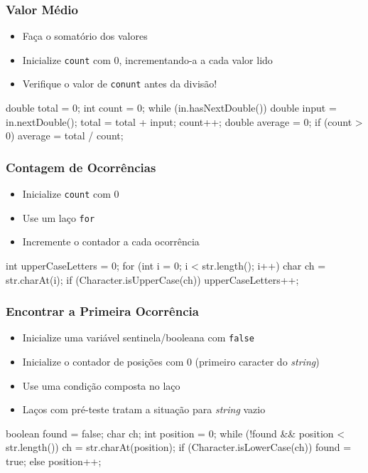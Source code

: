 \documentclass[xcolor={dvipsnames,table},aspectratio=169]{beamer}
\begin{document}
\begin{frame}[fragile]\frametitle{Valor Médio}
\begin{itemize}
	\item Faça o somatório dos valores
	\item Inicialize \texttt{count} com 0, incrementando-a a cada valor lido
	\item Verifique o valor de \texttt{conunt} antes da divisão!
\end{itemize}
{\footnotesize
\begin{javacode}
double total = 0;
int count = 0;
while (in.hasNextDouble()) {
   double input = in.nextDouble();
   total = total + input;
   count++;
}
double average = 0;
if (count > 0) {
   average = total / count;
}
\end{javacode}
}
\end{frame}

\begin{frame}[fragile]\frametitle{Contagem de Ocorrências}
\begin{itemize}
	\item Inicialize \texttt{count} com 0
	\item Use um laço \texttt{for}
	\item Incremente o contador a cada ocorrência
\end{itemize}
\begin{javacode}
int upperCaseLetters = 0;
for (int i = 0; i < str.length(); i++) {
   char ch = str.charAt(i);
   if (Character.isUpperCase(ch)) {
      upperCaseLetters++;
   }
}
\end{javacode}
\end{frame}

\begin{frame}[fragile]\frametitle{Encontrar a Primeira Ocorrência}
\begin{itemize}
	\item Inicialize uma variável sentinela/booleana com \texttt{false}
	\item Inicialize o contador de posições com 0 (primeiro caracter do \emph{string})
	\item Use uma condição composta no laço
	\item Laços com pré-teste tratam a situação para \emph{string} vazio
\end{itemize}
{\footnotesize
\begin{javacode}
boolean found = false;
char ch;
int position = 0;
while (!found && position < str.length()) {
   ch = str.charAt(position);
   if (Character.isLowerCase(ch)) { 
      found = true; 
   }
   else { position++; }
}
\end{javacode}
}
\end{frame}
\end{document}
